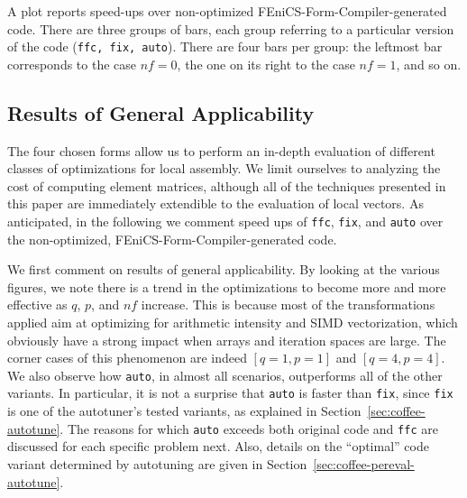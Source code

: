 A plot reports speed-ups over non-optimized FEniCS-Form-Compiler-generated code. There are three groups of bars, each group referring to a particular version of the code (\texttt{ffc, fix, auto}). There are four bars per group: the leftmost bar corresponds to the case $nf = 0$, the one on its right to the case $nf = 1$, and so on. 

\subsection{Results of General Applicability}
\label{sec:coffee-allforms-perf}
The four chosen forms allow us to perform an in-depth evaluation of different classes of optimizations for local assembly. We limit ourselves to analyzing the cost of computing element matrices, although all of the techniques presented in this paper are immediately extendible to the evaluation of local vectors. As anticipated, in the following we comment speed ups of \texttt{ffc}, \texttt{fix}, and \texttt{auto} over the non-optimized, FEniCS-Form-Compiler-generated code. 

We first comment on results of general applicability. By looking at the various figures, we note there is a trend in the optimizations to become more and more effective as $q$, $p$, and $nf$ increase. This is because most of the transformations applied aim at optimizing for arithmetic intensity and SIMD vectorization, which obviously have a strong impact when arrays and iteration spaces are large. The corner cases of this phenomenon are indeed $[q=1, p=1]$ and $[q=4, p=4]$. We also observe how \texttt{auto}, in almost all scenarios, outperforms all of the other variants. In particular, it is not a surprise that \texttt{auto} is faster than \texttt{fix}, since \texttt{fix} is one of the autotuner's tested variants, as explained in Section~\ref{sec:coffee-autotune}. The reasons for which \texttt{auto} exceeds both original code and \texttt{ffc} are discussed for each specific problem next. Also, details on the ``optimal'' code variant determined by autotuning are given in Section~\ref{sec:coffee-pereval-autotune}.

